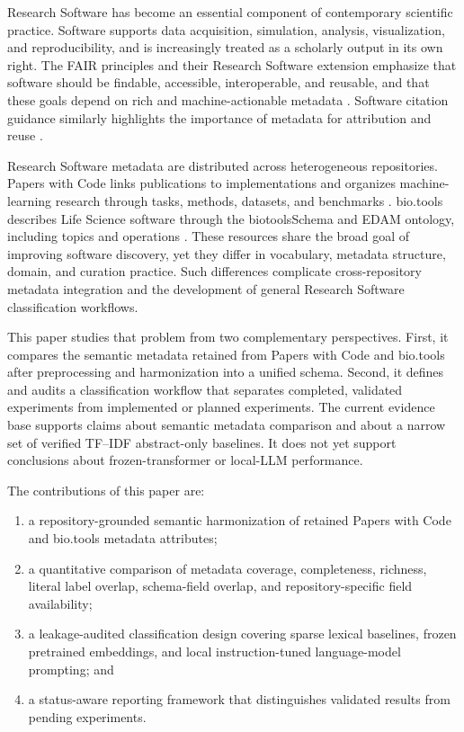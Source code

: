 \documentclass[pdflatex,sn-mathphys-num]{sn-jnl}
\theoremstyle{thmstyleone}%
\theoremstyle{thmstyletwo}%
\theoremstyle{thmstylethree}%
\begin{document}
Research Software has become an essential component of contemporary scientific practice. Software supports data acquisition, simulation, analysis, visualization, and reproducibility, and is increasingly treated as a scholarly output in its own right. The FAIR principles and their Research Software extension emphasize that software should be findable, accessible, interoperable, and reusable, and that these goals depend on rich and machine-actionable metadata \cite{Wilkinson2016FAIR,Lamprecht2020FAIRSoftware,Barker2022FAIR4RS,FAIR4RS2022Principles}. Software citation guidance similarly highlights the importance of metadata for attribution and reuse \cite{Smith2016SoftwareCitation}.

Research Software metadata are distributed across heterogeneous repositories. Papers with Code links publications to implementations and organizes machine-learning research through tasks, methods, datasets, and benchmarks \cite{PapersWithCodeWebsite}. bio.tools describes Life Science software through the biotoolsSchema and EDAM ontology, including topics and operations \cite{Ison2013EDAM,Ison2019BioTools,Ison2021BioToolsSchema}. These resources share the broad goal of improving software discovery, yet they differ in vocabulary, metadata structure, domain, and curation practice. Such differences complicate cross-repository metadata integration and the development of general Research Software classification workflows.

This paper studies that problem from two complementary perspectives. First, it compares the semantic metadata retained from Papers with Code and bio.tools after preprocessing and harmonization into a unified schema. Second, it defines and audits a classification workflow that separates completed, validated experiments from implemented or planned experiments. The current evidence base supports claims about semantic metadata comparison and about a narrow set of verified TF--IDF abstract-only baselines. It does not yet support conclusions about frozen-transformer or local-LLM performance.

The contributions of this paper are:

\begin{enumerate}
\item a repository-grounded semantic harmonization of retained Papers with Code and bio.tools metadata attributes;
\item a quantitative comparison of metadata coverage, completeness, richness, literal label overlap, schema-field overlap, and repository-specific field availability;
\item a leakage-audited classification design covering sparse lexical baselines, frozen pretrained embeddings, and local instruction-tuned language-model prompting; and
\item a status-aware reporting framework that distinguishes validated results from pending experiments.
\end{enumerate}
\end{document}
